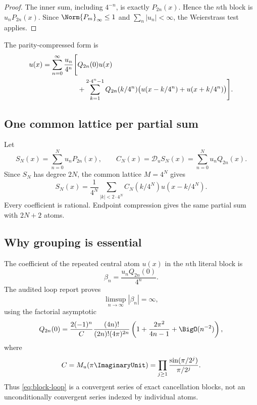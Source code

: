 \documentclass[11pt,oneside]{article}
\numberwithin{equation}{section}
\theoremstyle{definition}
\theoremstyle{remark}
\newcommand{\M}{M_u}
\newcommand{\Dscr}{\mathscr D_u}
\begin{document}
\begin{proof}
The inner sum, including $4^{-n}$, is exactly $P_{2n}(x)$.  Hence the $n$th
block is $u_nP_{2n}(x)$.  Since $\Norm{P_m}_{\infty}\le1$ and
$\sum_n|u_n|<\infty$, the Weierstrass test applies.
\end{proof}

The parity-compressed form is
\begin{align}
 u(x)=\sum_{n=0}^{\infty}\frac{u_n}{4^n}\Bigg[&Q_{2n}(0)u(x)\notag\\
 &+\sum_{k=1}^{2\cdot4^n-1}Q_{2n}(k/4^n)
 \bigl(u(x-k/4^n)+u(x+k/4^n)\bigr)\Bigg].
 \label{eq:block-loop-parity}
\end{align}

\subsection{One common lattice per partial sum}

Let
\begin{equation}
 S_N(x)=\sum_{n=0}^{N}u_nP_{2n}(x),\qquad
 C_N(x)=\Dscr S_N(x)=\sum_{n=0}^{N}u_nQ_{2n}(x).
 \label{eq:SN-CN}
\end{equation}
Since $S_N$ has degree $2N$, the common lattice $M=4^N$ gives
\begin{equation}
 S_N(x)=\frac1{4^N}\sum_{|k|<2\cdot4^N}
 C_N(k/4^N)u(x-k/4^N).
 \label{eq:fixed-lattice-loop}
\end{equation}
Every coefficient is rational.  Endpoint compression gives the same partial
sum with $2N+2$ atoms.

\subsection{Why grouping is essential}

The coefficient of the repeated central atom $u(x)$ in the $n$th literal block
is
\begin{equation}
 \beta_n=\frac{u_nQ_{2n}(0)}{4^n}.
 \label{eq:central-beta}
\end{equation}
The audited loop report proves
\begin{equation}
 \limsup_{n\to\infty}|\beta_n|=\infty,
 \label{eq:nonflattening}
\end{equation}
using the factorial asymptotic
\begin{equation}
 Q_{2n}(0)=\frac{2(-1)^n}{C}
 \frac{(4n)!}{(2n)!(4\pi)^{2n}}
 \left(1+\frac{2\pi^2}{4n-1}+\BigO(n^{-2})\right),
 \label{eq:Q0-asymptotic}
\end{equation}
where
\[
 C=\M(\pi\ImaginaryUnit)=\prod_{j\ge1}\frac{\sin(\pi/2^j)}{\pi/2^j}.
\]
Thus \eqref{eq:block-loop} is a convergent series of exact cancellation
blocks, not an unconditionally convergent series indexed by individual atoms.
\end{document}

